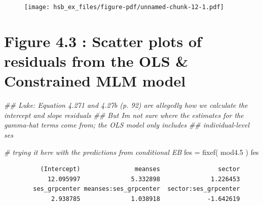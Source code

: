\documentclass[
  letterpaper,
  DIV=11,
  numbers=noendperiod]{scrreprt}
\newenvironment{Shaded}{\begin{snugshade}}{\end{snugshade}}
\newcommand{\CommentTok}[1]{\textcolor[rgb]{0.38,0.63,0.69}{\textit{#1}}}
\newcommand{\DocumentationTok}[1]{\textcolor[rgb]{0.73,0.13,0.13}{\textit{#1}}}
\newcommand{\FloatTok}[1]{\textcolor[rgb]{0.25,0.63,0.44}{#1}}
\newcommand{\FunctionTok}[1]{\textcolor[rgb]{0.02,0.16,0.49}{#1}}
\newcommand{\NormalTok}[1]{\textcolor[rgb]{0.00,0.44,0.13}{#1}}
\newcommand{\OtherTok}[1]{\textcolor[rgb]{0.00,0.44,0.13}{#1}}
\begin{document}
\begin{figure}[H]

{\centering \texttt{[image: hsb\_ex\_files/figure-pdf/unnamed-chunk-12-1.pdf]}

}

\end{figure}

\hypertarget{figure-4.3-scatter-plots-of-residuals-from-the-ols-constrained-mlm-model}{%
\section{Figure 4.3 : Scatter plots of residuals from the OLS \&
Constrained MLM
model}\label{figure-4.3-scatter-plots-of-residuals-from-the-ols-constrained-mlm-model}}

\begin{Shaded}
\begin{Highlighting}[]
\DocumentationTok{\#\# Luke: Equation 4.271 and 4.27b (p. 92) are allegedly how we calculate the intercept and slope residuals }
\DocumentationTok{\#\# But I\textquotesingle{}m not sure where the estimates for the gamma{-}hat terms come from; the OLS model only includes}
\DocumentationTok{\#\# individual{-}level ses}

\CommentTok{\# trying it here with the predictions from conditional EB}
\NormalTok{fes }\OtherTok{=} \FunctionTok{fixef}\NormalTok{( mod4}\FloatTok{.5}\NormalTok{ )}
\NormalTok{fes}
\end{Highlighting}
\end{Shaded}

\begin{verbatim}
          (Intercept)               meanses                sector 
            12.095997              5.332898              1.226453 
        ses_grpcenter meanses:ses_grpcenter  sector:ses_grpcenter 
             2.938785              1.038918             -1.642619 
\end{verbatim}
\end{document}
